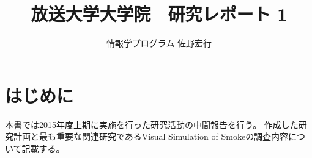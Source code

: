 \documentclass{ujarticle}
\begin{document}
\title{放送大学大学院　研究レポート 1 }
\author{情報学プログラム 佐野宏行}
\maketitle

\section{はじめに}
本書では2015年度上期に実施を行った研究活動の中間報告を行う。
作成した研究計画と最も重要な関連研究であるVisual Simulation of Smoke\cite{Fedkiw2001}の調査内容について記載する。



\end{document}
